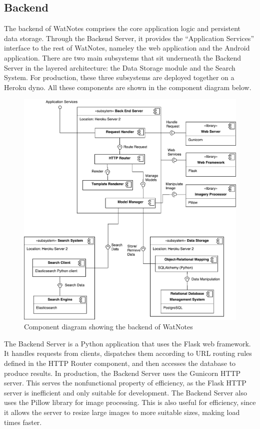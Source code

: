 \documentclass[12pt]{article}
\begin{document}
  \subsection{Backend}
    The backend of WatNotes comprises the core application logic and persistent
    data storage. Through the Backend Server, it provides the ``Application
    Services'' interface to the rest of WatNotes, nameley the web application
    and the Android application. There are two main subsystems that sit
    underneath the Backend Server in the layered architecture: the Data Storage
    module and the Search System. For production, these three subsystems are
    deployed together on a Heroku dyno. All these components are shown in the
    component diagram below.

    \begin{figure}[H]
      \includegraphics[width=\textwidth]{assets/backend-component.pdf}
      \caption{Component diagram showing the backend of WatNotes}
    \end{figure}

    The Backend Server is a Python application that uses the Flask web
    framework. It handles requests from clients, dispatches them according to
    URL routing rules defined in the HTTP Router component, and then accesses
    the database to produce results. In production, the Backend Server uses the
    Gunicorn HTTP server. This serves the nonfunctional property of efficiency,
    as the Flask HTTP server is inefficient and only suitable for development.
    The Backend Server also uses the Pillow library for image processing. This
    is also useful for efficiency, since it allows the server to resize large
    images to more suitable sizes, making load times faster.\\
\end{document}
